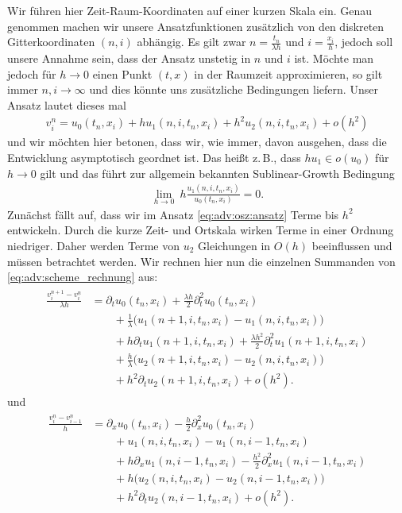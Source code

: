 Wir führen hier Zeit-Raum-Koordinaten auf einer kurzen Skala ein.
Genau genommen machen wir unsere Ansatzfunktionen zusätzlich von den diskreten Gitterkoordinaten $(n,i)$ abhängig.
Es gilt zwar $n = \frac {t_n} {\lambda h}$ und $i = \frac {x_i}{h}$, jedoch soll unsere Annahme sein, dass der Ansatz unstetig in $n$ und $i$ ist.
Möchte man jedoch für $h \to 0$ einen Punkt $(t,x)$ in der Raumzeit approximieren, so gilt immer $n,i \to \infty$ und dies könnte uns zusätzliche Bedingungen liefern.
Unser Ansatz lautet dieses mal
\begin{align}\label{eq:adv:osz:ansatz}
v^n_i = u_0(t_n, x_i) + h u_1(n, i, t_n, x_i) + h^2 u_2(n, i, t_n, x_i) + o(h^2)
\end{align}
und wir möchten hier betonen, dass wir, wie immer, davon ausgehen, dass die Entwicklung asymptotisch geordnet ist.
Das heißt z.\,B., dass $h u_1 \in o(u_0)$ für $h \to 0$ gilt und das führt zur allgemein bekannten Sublinear-Growth Bedingung
\begin{align}
\lim_{h \to 0} \: h \frac{u_1(n, i, t_n, x_i)}{u_0(t_n, x_i)} = 0.
\end{align}
Zunächst fällt auf, dass wir im Ansatz \eqref{eq:adv:osz:ansatz} Terme bis $h^2$ entwickeln.
Durch die kurze Zeit- und Ortskala wirken Terme in einer Ordnung niedriger.
Daher werden Terme von $u_2$ Gleichungen in $O(h)$ beeinflussen und müssen betrachtet werden.
Wir rechnen hier nun die einzelnen Summanden von \eqref{eq:adv:scheme_rechnung} aus:
{\small
\begin{align} \label{eq:adv:osz:diff1}
\begin{split}
\frac {v^{n+1}_i - v^n_i} {\lambda h}
&= \partial_t u_0(t_n, x_i) + \frac {\lambda h}{2} \partial^2_t u_0(t_n, x_i)\\
&\qquad + \frac 1 \lambda \bigl( u_1(n+1, i, t_n, x_i) - u_1(n, i, t_n, x_i) \bigr)\\
&\qquad + h \partial_t u_1(n+1, i, t_n, x_i) + \frac {\lambda h^2}{2} \partial^2_t u_1(n+1, i, t_n, x_i)\\
&\qquad + \frac h \lambda \bigl( u_2(n+1, i, t_n, x_i) - u_2(n, i, t_n, x_i) \bigr)\\
&\qquad + h^2 \partial_t u_2(n+1, i, t_n, x_i) + o(h^2).
\end{split}
\end{align}
} und
{\small 
\begin{align} \label{eq:adv:osz:diff2}
\begin{split}
\frac {v^n_i - v^n_{i-1}} h 
&= \partial_x u_0(t_n, x_i) - \frac {h}{2} \partial^2_x u_0(t_n, x_i)\\
&\qquad + u_1(n, i, t_n, x_i) - u_1(n, i-1, t_n, x_i)\\
&\qquad + h \partial_x u_1(n, i-1, t_n, x_i) - \frac {h^2}{2} \partial^2_x u_1(n, i-1, t_n, x_i)\\
&\qquad + h \bigl( u_2(n, i, t_n, x_i) - u_2(n, i-1, t_n, x_i) \bigr)\\
&\qquad + h^2 \partial_t u_2(n, i-1, t_n, x_i) + o(h^2).
\end{split}
\end{align}
}
